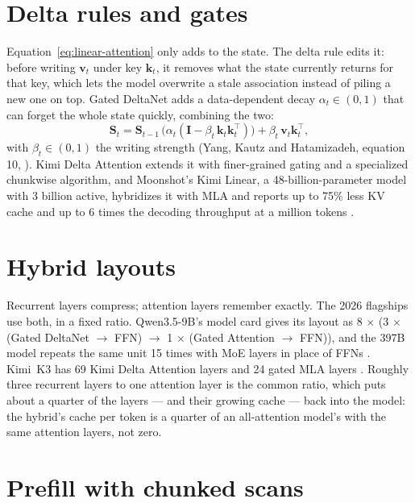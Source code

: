 \section{Delta rules and gates}

Equation~\eqref{eq:linear-attention} only adds to the state. The delta rule
edits it: before writing $\mathbf{v}_t$ under key $\mathbf{k}_t$, it removes
what the state currently returns for that key, which lets the model overwrite
a stale association instead of piling a new one on top. Gated DeltaNet adds a
data-dependent decay $\alpha_t \in (0,1)$ that can forget the whole state
quickly, combining the two:
\begin{equation}
\mathbf{S}_t = \mathbf{S}_{t-1}\,\bigl(\alpha_t(\mathbf{I} - \beta_t\,\mathbf{k}_t\mathbf{k}_t^{\top})\bigr) + \beta_t\,\mathbf{v}_t\mathbf{k}_t^{\top},
\label{eq:gated-delta}
\end{equation}
with $\beta_t \in (0,1)$ the writing strength (Yang, Kautz and Hatamizadeh,
equation 10, \cite{yang2025gateddeltanet}). Kimi Delta Attention extends it
with finer-grained gating and a specialized chunkwise algorithm, and Moonshot's
Kimi Linear, a 48-billion-parameter model with 3
billion active, hybridizes it with MLA and reports up to 75\% less KV cache and
up to 6 times the decoding throughput at a million tokens
\cite{kimi2025linear}.

\section{Hybrid layouts}

Recurrent layers compress; attention layers remember exactly. The 2026
flagships use both, in a fixed ratio. Qwen3.5-9B's model card gives its layout
as 8 $\times$ (3 $\times$ (Gated DeltaNet $\rightarrow$ FFN) $\rightarrow$ 1
$\times$ (Gated Attention $\rightarrow$ FFN)), and the
397B model repeats the same unit 15 times with MoE layers in place of FFNs
\cite{qwen2026qwen35config}. Kimi~K3 has 69 Kimi Delta Attention layers and 24
gated MLA layers \cite{moonshot2026kimik3}. Roughly three recurrent layers to
one attention layer is the common ratio, which puts about a quarter of the
layers --- and their growing cache --- back into the model: the hybrid's cache
per token is a quarter of an all-attention model's with the same attention
layers, not zero.

\section{Prefill with chunked scans}


